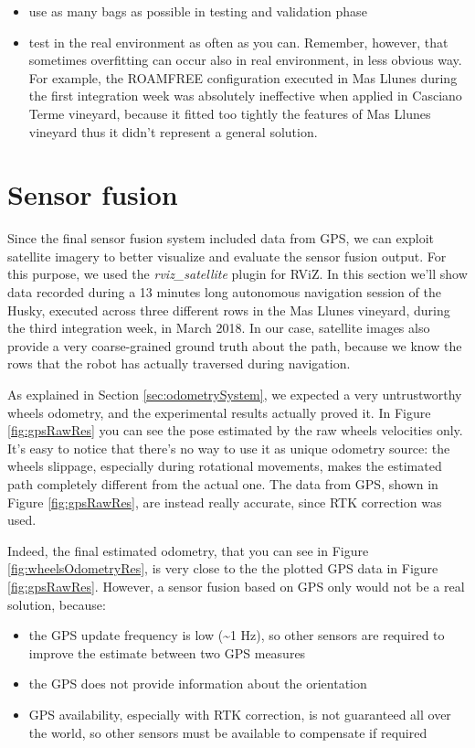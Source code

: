 \begin{enumerate}
\begin{itemize}
	\begin{itemize}
		\item use as many bags as possible in testing and validation phase
		\item test in the real environment as often as you can. Remember, however, that sometimes overfitting can occur also in real environment, in less obvious way. For example, the ROAMFREE configuration executed in Mas Llunes during the first integration week was absolutely ineffective when applied in Casciano Terme vineyard, because it fitted too tightly the features of Mas Llunes vineyard thus it didn't represent a general solution.
	\end{itemize}
\end{itemize}

\end{enumerate}

\section{Sensor fusion}\label{sec:resultsOdometry}

Since the final sensor fusion system included data from GPS, we can exploit satellite imagery to better visualize and evaluate the sensor fusion output. For this purpose, we used the \textit{rviz\_satellite} plugin for RViZ. In this section we'll show data recorded during a 13 minutes long autonomous navigation session of the Husky, executed across three different rows in the Mas Llunes vineyard, during the third integration week, in March 2018. In our case, satellite images also provide a very coarse-grained ground truth about the path, because we know the rows that the robot has actually traversed during navigation.

\par As explained in Section \ref{sec:odometrySystem}, we expected a very untrustworthy wheels odometry, and the experimental results actually proved it. In Figure \ref{fig:gpsRawRes} you can see the pose estimated by the raw wheels velocities only. It's easy to notice that there's no way to use it as unique odometry source: the wheels slippage, especially during rotational movements, makes the estimated path completely different from the actual one. The data from GPS, shown in Figure \ref{fig:gpsRawRes}, are instead really accurate, since RTK correction was used. 
\par Indeed, the final estimated odometry, that you can see in Figure \ref{fig:wheelsOdometryRes}, is very close to the the plotted GPS data in Figure \ref{fig:gpsRawRes}. However, a sensor fusion based on GPS only would not be a real solution, because:
\begin{itemize}
	\item the GPS update frequency is low (\textasciitilde1 Hz), so other sensors are required to improve the estimate between two GPS measures
	\item the GPS does not provide information about the orientation
	\item GPS availability, especially with RTK correction, is not guaranteed all over the world, so other sensors must be available to compensate if required
\end{itemize}

